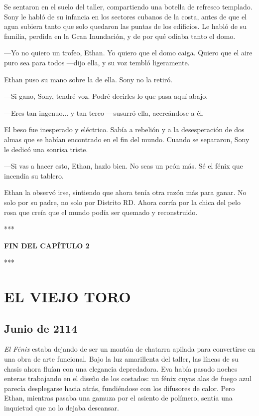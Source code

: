 \documentclass[11pt,twoside]{book}
\begin{document}
Se sentaron en el suelo del taller, compartiendo una botella de refresco templado. Sony le habló de su infancia en los sectores cubanos de la costa, antes de que el agua subiera tanto que solo quedaron las puntas de los edificios. Le habló de su familia, perdida en la Gran Inundación, y de por qué odiaba tanto el domo.

---Yo no quiero un trofeo, Ethan. Yo quiero que el domo caiga. Quiero que el aire puro sea para todos ---dijo ella, y su voz tembló ligeramente.

Ethan puso su mano sobre la de ella. Sony no la retiró.

---Si gano, Sony, tendré voz. Podré decirles lo que pasa aquí abajo.

---Eres tan ingenuo... y tan terco ---susurró ella, acercándose a él.

El beso fue inesperado y eléctrico. Sabía a rebelión y a la desesperación de dos almas que se habían encontrado en el fin del mundo. Cuando se separaron, Sony le dedicó una sonrisa triste.

---Si vas a hacer esto, Ethan, hazlo bien. No seas un peón más. Sé el fénix que incendia su tablero.

Ethan la observó irse, sintiendo que ahora tenía otra razón más para ganar. No solo por su padre, no solo por Distrito RD. Ahora corría por la chica del pelo rosa que creía que el mundo podía ser quemado y reconstruido.

\bigskip
\begin{center}***\end{center}
\bigskip

\textbf{FIN DEL CAPÍTULO 2}


\bigskip
\begin{center}***\end{center}
\bigskip

\chapter{EL VIEJO TORO}

\section*{Junio de 2114}

\textit{El Fénix} estaba dejando de ser un montón de chatarra apilada para convertirse en una obra de arte funcional. Bajo la luz amarillenta del taller, las líneas de su chasis ahora fluían con una elegancia depredadora. Eva había pasado noches enteras trabajando en el diseño de los costados: un fénix cuyas alas de fuego azul parecía desplegarse hacia atrás, fundiéndose con los difusores de calor. Pero Ethan, mientras pasaba una gamuza por el asiento de polímero, sentía una inquietud que no lo dejaba descansar.
\end{document}

